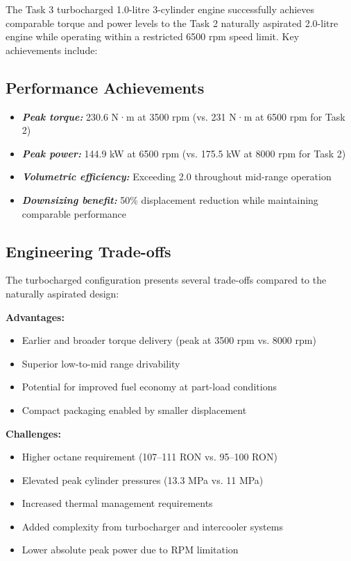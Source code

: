 The Task 3 turbocharged 1.0-litre 3-cylinder engine successfully achieves comparable torque and power levels to the Task 2 naturally aspirated 2.0-litre engine while operating within a restricted 6500 rpm speed limit. Key achievements include:

\subsection{Performance Achievements}
\begin{itemize}
    \item \textbf{\textit{Peak torque:}} 230.6 N·m at 3500 rpm (vs. 231 N·m at 6500 rpm for Task 2)
    \item \textbf{\textit{Peak power:}} 144.9 kW at 6500 rpm (vs. 175.5 kW at 8000 rpm for Task 2)
    \item \textbf{\textit{Volumetric efficiency:}} Exceeding 2.0 throughout mid-range operation
    \item \textbf{\textit{Downsizing benefit:}} 50\% displacement reduction while maintaining comparable performance
\end{itemize}

\subsection{Engineering Trade-offs}
The turbocharged configuration presents several trade-offs compared to the naturally aspirated design:

\textbf{Advantages:}
\begin{itemize}
    \item Earlier and broader torque delivery (peak at 3500 rpm vs. 8000 rpm)
    \item Superior low-to-mid range drivability
    \item Potential for improved fuel economy at part-load conditions
    \item Compact packaging enabled by smaller displacement
\end{itemize}

\textbf{Challenges:}
\begin{itemize}
    \item Higher octane requirement (107--111 RON vs. 95--100 RON)
    \item Elevated peak cylinder pressures (13.3 MPa vs. 11 MPa)
    \item Increased thermal management requirements
    \item Added complexity from turbocharger and intercooler systems
    \item Lower absolute peak power due to RPM limitation
\end{itemize}


